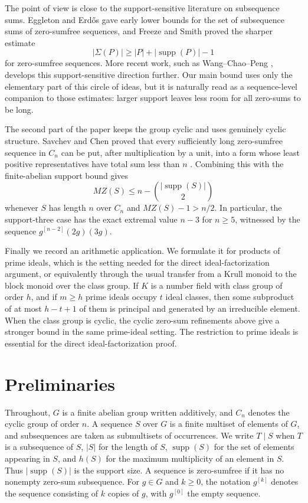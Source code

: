 \documentclass[12pt,reqno]{amsart}
\theoremstyle{definition}
\theoremstyle{remark}
\DeclareMathOperator{\supp}{supp}
\begin{document}
The point of view is close to the support-sensitive literature on subsequence sums.  Eggleton and Erd\H{o}s \cite{EggletonErdos1972} gave early lower bounds for the set of subsequence sums of zero-sumfree sequences, and Freeze and Smith \cite{Freeze2001} proved the sharper estimate
\[
  |\Sigma(P)|\ge |P|+|\supp(P)|-1
\]
for zero-sumfree sequences.  More recent work, such as Wang--Chao--Peng \cite{WangChaoPeng2024}, develops this support-sensitive direction further.  Our main bound uses only the elementary part of this circle of ideas, but it is naturally read as a sequence-level companion to those estimates: larger support leaves less room for all zero-sums to be long.

The second part of the paper keeps the group cyclic and uses genuinely cyclic structure.  Savchev and Chen proved that every sufficiently long zero-sumfree sequence in $C_n$ can be put, after multiplication by a unit, into a form whose least positive representatives have total sum less than $n$ \cite{SavchevChen2006}.  Combining this with the finite-abelian support bound gives
\begin{equation} \label{eq:thm41}
  MZ(S)\le n-\binom{|\supp(S)|}{2}
\end{equation}
whenever $S$ has length $n$ over $C_n$ and $MZ(S)-1>n/2$.  In particular, the support-three case has the exact extremal value $n-3$ for $n\ge 5$, witnessed by the sequence $g^{[n-2]}(2g)(3g)$.

Finally we record an arithmetic application.  We formulate it for products of prime ideals, which is the setting needed for the direct ideal-factorization argument, or equivalently through the usual transfer from a Krull monoid to the block monoid over the class group.  If $K$ is a number field with class group of order $h$, and if $m\ge h$ prime ideals occupy $t$ ideal classes, then some subproduct of at most $h-t+1$ of them is principal and generated by an irreducible element.  When the class group is cyclic, the cyclic zero-sum refinements above give a stronger bound in the same prime-ideal setting.  The restriction to prime ideals is essential for the direct ideal-factorization proof.

\section{Preliminaries}

Throughout, $G$ is a finite abelian group written additively, and $C_n$ denotes the cyclic group of order $n$.  A sequence $S$ over $G$ is a finite multiset of elements of $G$, and subsequences are taken as submultisets of occurrences.  We write $T\mid S$ when $T$ is a subsequence of $S$, $|S|$ for the length of $S$, $\supp(S)$ for the set of elements appearing in $S$, and $h(S)$ for the maximum multiplicity of an element in $S$.  Thus $|\supp(S)|$ is the support size.  A sequence is zero-sumfree if it has no nonempty zero-sum subsequence.  For $g\in G$ and $k\ge 0$, the notation $g^{[k]}$ denotes the sequence consisting of $k$ copies of $g$, with $g^{[0]}$ the empty sequence.
\end{document}
